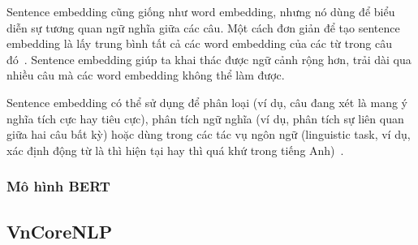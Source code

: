 
Sentence embedding cũng giống như word embedding, nhưng nó dùng để biểu diễn sự
tương quan ngữ nghĩa giữa các câu. Một cách đơn giản để tạo sentence embedding
là lấy trung bình tất cả các word embedding của các từ trong câu
đó~\cite{lamGomCumVan2021}. Sentence embedding giúp ta khai thác được ngữ cảnh rộng hơn, trải dài qua nhiều câu mà các word embedding không thể làm được.

Sentence embedding có thể sử dụng để phân loại (ví dụ, câu đang xét là mang ý
nghĩa tích cực hay tiêu cực), phân tích ngữ nghĩa (ví dụ, phân tích sự liên
quan giữa hai câu bất kỳ) hoặc dùng trong các tác vụ ngôn ngữ (linguistic task,
ví dụ, xác định động từ là thì hiện tại hay thì quá khứ trong tiếng
Anh)~\cite{heidenreichPaperSummaryEvaluation2018}.

\subsubsection{Mô hình BERT}

\subsection{VnCoreNLP}
